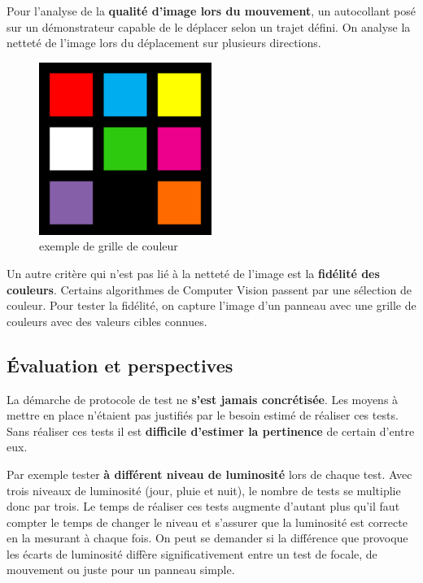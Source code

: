 Pour l'analyse de la \textbf{qualité d'image lors du mouvement}, un autocollant posé sur un démonstrateur capable de le déplacer selon un trajet défini. On analyse la netteté de l'image lors du déplacement sur plusieurs directions.


\begin{minipage}{0.2\textwidth}
\begin{figure}[H]
    \includegraphics[width=0.5\textwidth]{img/grille_couleur.png}
    \centering
    \caption{exemple de grille de couleur}
\end{figure}
\end{minipage}
\hfill%
\begin{minipage}[adjusting]{0.7\textwidth}
Un autre critère qui n'est pas lié à la netteté de l'image est la \textbf{fidélité des couleurs}. Certains algorithmes de Computer Vision passent par une sélection de couleur. Pour tester la fidélité, on capture l'image d'un panneau avec une grille de couleurs avec des valeurs cibles connues. 
\end{minipage}\par

\subsection{Évaluation et perspectives}

La démarche de protocole de test ne \textbf{s'est jamais concrétisée}. Les moyens à mettre en place n'étaient pas justifiés par le besoin estimé de réaliser ces tests. Sans réaliser ces tests il est \textbf{difficile d'estimer la pertinence} de certain d'entre eux.

Par exemple tester \textbf{à différent niveau de luminosité} lors de chaque test. Avec trois niveaux de luminosité (jour, pluie et nuit), le nombre de tests se multiplie donc par trois. Le temps de réaliser ces tests augmente d'autant plus qu'il faut compter le temps de changer le niveau et s'assurer que la luminosité est correcte en la mesurant à chaque fois. On peut se demander si la différence que provoque les écarts de luminosité diffère significativement entre un test de focale, de mouvement ou juste pour un panneau simple.

